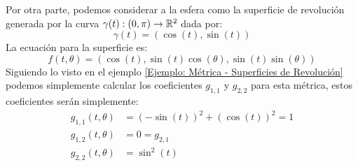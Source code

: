 \begin{example}[$2-$Esfera]
	Por otra parte, podemos considerar a la esfera como la superficie de revolución generada por la curva $\gamma(t): (0,\pi) \to \mathbb{R}^{2}$ dada por:
	\[
		\gamma(t) = (\cos(t),\sin(t))
	\]
	La ecuación para la superficie es:
	\[
		f(t,\theta) = (\cos(t), \sin(t)\cos(\theta), \sin(t)\sin(\theta))
	\]
	Siguiendo lo visto en el ejemplo \ref{Ejemplo: Métrica - Superficies de Revolución} podemos simplemente calcular los coeficientes $g_{1,1}$ y $g_{2,2}$ para esta métrica, estos coeficientes serán simplemente:
	\begin{align*}
		g_{1,1}(t,\theta) & = (-\sin(t))^{2} + (\cos(t))^{2} = 1 \\
		g_{1,2}(t,\theta) & = 0 = g_{2,1}                        \\
		g_{2,2}(t,\theta) & = \sin^{2}(t)
	\end{align*}
\end{example}

